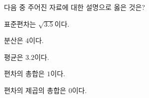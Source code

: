 다음 중 주어진 자료에 대한 설명으로 옳은 것은?
\begin{choicesii}{\rule[-3ex]{0pt}{8ex}표준편차는 $\sqrt{3.5}$이다.}{\rule[-3ex]{0pt}{8ex}분산은 $4$이다.}{\rule[-3ex]{0pt}{8ex}평균은 $3.2$이다.}{\rule[-3ex]{0pt}{8ex}편차의 총합은 $1$이다.}{\rule[-3ex]{0pt}{8ex}편차의 제곱의 총합은 $0$이다.}\end{choicesii}

